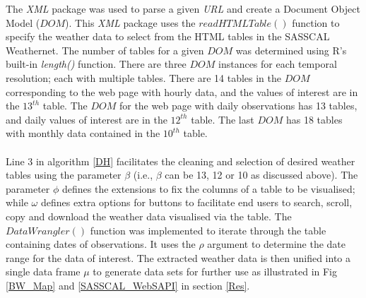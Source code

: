 \documentclass[a4paper, 10pt, conference]{ieeeconf}      %
\begin{document}
\noindent
 The  \emph{XML} package \cite{lang2013package}  was used  to parse a given \emph{URL} and create a Document Object Model ($DOM$). %
This \emph{XML} package uses the $readHTMLTable()$ function %
to  specify the weather data to  select from  the HTML tables in the SASSCAL Weathernet. 
 The number of tables for a given $DOM$  was  determined using R's built-in  \emph{length()} function. There are three $DOM$ instances for each temporal resolution; each with  multiple tables. 
There are 14 tables in the $DOM$ corresponding to the web page with  hourly data, and the values of  interest are in the $13^{th}$ table. The $DOM$ for  the web page with   daily observations has   13 tables, and daily values of interest are in the $12^{th}$ table. The last $DOM$  has 18 tables with    monthly  data contained  in the $10^{th}$ table. 
\\
\\
Line 3 in algorithm \ref{DH}  facilitates the cleaning and selection of  desired weather tables  using the parameter $\beta$ (i.e., $\beta$ can be 13, 12 or 10 as discussed above). 
The parameter $\phi$ defines the extensions to fix the columns of a table to be visualised; while $\omega$ defines extra options for buttons    to facilitate end users to search, scroll, copy and download the weather data visualised via the table.
 The  $DataWrangler()$ function was implemented to iterate through the table containing  dates of  observations. It uses the $\rho$ argument to determine the date range  for the data of interest. The extracted weather data is then unified into a single data frame $\mu$ to generate   data sets for further use as illustrated in Fig \ref{BW_Map} and 
  \ref{SASSCAL_WebSAPI} in section \ref{Res}.
  
\end{document}
